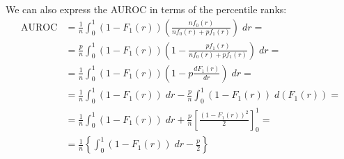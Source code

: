 
We can also express the AUROC in terms of the percentile ranks:
%
\begin{align}
    \text{AUROC}
    &= \frac{1}{n} \int_{0}^{1}
        (1 - F_1(r)) \left(\frac{n f_0(r)}{nf_0(r) + pf_1(r)}\right) \;dr
    =\nonumber\\ &
    =  \frac{p}{n} \int_{0}^{1}
        (1 - F_1(r)) \left(1 - \frac{pf_1(r)}{nf_0(r) + pf_1(r)}\right) \;dr
    =\nonumber\\ &
        = \frac{1}{n} \int_{0}^{1} (1 - F_1(r)) \left(1 - p \frac{dF_1(r)}{dr}\right) \;dr
    =\nonumber\\ &
    =
        \frac{1}{n} \int_{0}^{1} (1 - F_1(r)) \;dr
        - \frac{p}{n} \int_{0}^{1}
            (1 - F_1(r)) \;d(F_1(r))
    =\nonumber\\ &
    =
        \frac{1}{n} \int_{0}^{1} (1 - F_1(r)) \;dr
        + \frac{p}{n} \left[
            \frac{(1 - F_1(r))^2}{2}
        \right]^1_0
    =\nonumber\\ &
    =
        \frac{1}{n} \left\{
            \int_{0}^{1} (1 - F_1(r)) \;dr - \frac{p}{2}
        \right\}
    \label{eq:auroc ranks}
\end{align}

